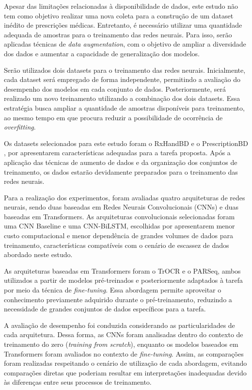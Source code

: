 \documentclass[11pt,a4paper]{article}
\begin{document}

Apesar das limitações relacionadas à disponibilidade de dados, este estudo não tem como objetivo realizar uma nova coleta para a construção de um dataset inédito de prescrições médicas. Entretanto, é necessário utilizar uma quantidade adequada de amostras para o treinamento das redes neurais. Para isso, serão aplicadas técnicas de \textit{data augmentation}, com o objetivo de ampliar a diversidade dos dados e aumentar a capacidade de generalização dos modelos.

Serão utilizados dois datasets para o treinamento das redes neurais. Inicialmente, cada dataset será empregado de forma independente, permitindo a avaliação do desempenho dos modelos em cada conjunto de dados. Posteriormente, será realizado um novo treinamento utilizando a combinação dos dois datasets. Essa estratégia busca ampliar a quantidade de amostras disponíveis para treinamento, ao mesmo tempo em que procura reduzir a possibilidade de ocorrência de \textit{overfitting}.

Os datasets selecionados para este estudo foram o RxHandBD \cite{islam2026rxhandbd} e o PrescriptionBD \cite{abdur_rahim_mia_abdullah_al_mamun_abdullah_al_sajid_aurunave_mollik_ruddra_2024}, por apresentarem características adequadas para a tarefa proposta. Após a aplicação das técnicas de aumento de dados e da organização dos conjuntos de treinamento, os dados estarão devidamente preparados para o treinamento das redes neurais.

Para a realização dos experimentos, foram avaliadas quatro arquiteturas de redes neurais, sendo duas baseadas em Redes Neurais Convolucionais (CNNs) e duas baseadas em Transformers. As arquiteturas convolucionais selecionadas foram uma CNN Baseline e uma CNN-BiLSTM, escolhidas por apresentarem menor custo computacional e menor dependência de grandes volumes de dados para treinamento, características compatíveis com o cenário de escassez de dados abordado neste estudo.

As arquiteturas baseadas em Transformers foram o TrOCR e o PARSeq, ambos utilizados a partir de modelos pré-treinados e posteriormente adaptados à tarefa por meio da técnica de \textit{fine-tuning}. Essa abordagem permite aproveitar o conhecimento previamente adquirido durante o pré-treinamento, reduzindo a necessidade de grandes conjuntos de dados específicos para a tarefa.

A avaliação de desempenho foi conduzida considerando as particularidades de cada arquitetura. Dessa forma, as CNNs foram analisadas dentro do contexto de treinamento do zero (\textit{training from scratch}), enquanto os modelos baseados em Transformers foram avaliados no contexto de \textit{fine-tuning}. Assim, as comparações foram realizadas respeitando o cenário de utilização de cada abordagem, evitando comparações diretas que poderiam resultar em interpretações inadequadas devido às diferenças entre seus processos de treinamento.
\end{document}
